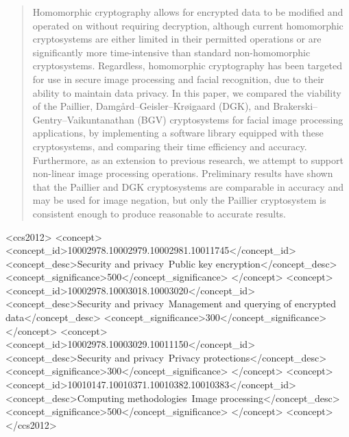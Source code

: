 \documentclass{sig-alternate-05-2015}
\begin{document}
\begin{abstract}
Homomorphic cryptography allows for encrypted data to be modified and operated on without requiring decryption, although current homomorphic cryptosystems are either limited in their permitted operations or are significantly more time-intensive than standard non-homomorphic cryptosystems. Regardless, homomorphic cryptography has been targeted for use in secure image processing and facial recognition, due to their ability to maintain data privacy. In this paper, we compared the viability of the Paillier, Damg{\aa}rd--Geisler--Kr{\o}igaard (DGK), and Brakerski--Gentry--Vaikuntanathan (BGV) cryptosystems for facial image processing applications, by implementing a software library equipped with these cryptosystems, and comparing their time efficiency and accuracy. Furthermore, as an extension to previous research, we attempt to support non-linear image processing operations. Preliminary results have shown that the Paillier and DGK cryptosystems are comparable in accuracy and may be used for image negation, but only the Paillier cryptosystem is consistent enough to produce reasonable to accurate results.
\end{abstract}

%
%
\begin{CCSXML}
  <ccs2012>
  <concept>
  <concept_id>10002978.10002979.10002981.10011745</concept_id>
  <concept_desc>Security and privacy~Public key encryption</concept_desc>
  <concept_significance>500</concept_significance>
  </concept>
  <concept>
  <concept_id>10002978.10003018.10003020</concept_id>
  <concept_desc>Security and privacy~Management and querying of encrypted data</concept_desc>
  <concept_significance>300</concept_significance>
  </concept>
  <concept>
  <concept_id>10002978.10003029.10011150</concept_id>
  <concept_desc>Security and privacy~Privacy protections</concept_desc>
  <concept_significance>300</concept_significance>
  </concept>
  <concept>
  <concept_id>10010147.10010371.10010382.10010383</concept_id>
  <concept_desc>Computing methodologies~Image processing</concept_desc>
  <concept_significance>500</concept_significance>
  </concept>
  <concept>
  </ccs2012>
\end{CCSXML}

\end{document}

